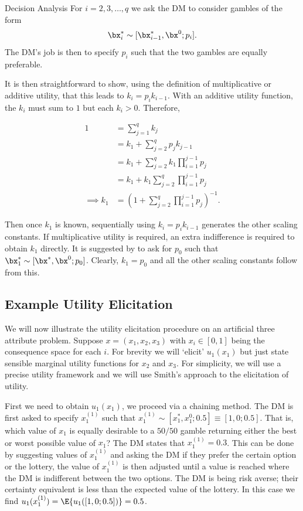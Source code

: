 \begin{chapter}{Decision Analysis \label{Ch:decision}}
For $i = 2,3,\ldots,q$ we ask the DM to consider gambles of the form
$$ \bx^* _i \sim [\bx_{i-1}^*, \bx^0; p_i]. $$
The DM's job is then to specify $p_i$ such that the two gambles are equally preferable.

It is then straightforward to show, using the definition of multiplicative or additive utility, that this leads to $k_i = p_i k_{i-1}$. With an additive utility function, the $k_i$ must sum to $1$ but each $k_i > 0$. Therefore,

\begin{align}
	1 &= \sum_{j=1}^q k_j\\
	& = k_1 + \sum_{j=2}^q p_j k_{j-1}\\
	& = k_1 + \sum_{j=2}^q k_1 \prod_{i=1}^{j-1} p_j\\
	& = k_1 + k_1\sum_{j=2}^q \prod_{i=1}^{j-1} p_j\\
	\implies  k_1 & = \left(1 + \sum_{j=2}^q \prod_{i=1}^{j-1} p_j \right)^{-1}. \label{Eq:k1-soln}
\end{align}

Then once $k_1$ is known, sequentially using $k_i = p_i k_{i-1}$ generates the other scaling constants. If multiplicative utility is required, an extra indifference is required to obtain $k_1$ directly. It is suggested by \citet{Smith2010} to ask for $p_0$ such that $\bx_1 ^* \sim [\bx^*, \bx^0 ;p_0]$. Clearly, $k_1 = p_0$ and all the other scaling constants follow from this.

\subsection{Example Utility Elicitation}

We will now illustrate the utility elicitation procedure on an artificial three attribute problem. Suppose $x = (x_1, x_2, x_3)$ with $x_i \in [0,1]$ being the consequence space for each $i$. For brevity we will `elicit' $u_1(x_1)$ but just state sensible marginal utility functions for $x_2$ and $x_3$. For simplicity, we will use a precise utility framework and we will use Smith's approach to the elicitation of utility.

First we need to obtain $u_1(x_1)$, we proceed via a chaining method. The DM is first asked to specify $x_1^{(1)}$ such that $x_1^{(1)} \sim [x_1^*, x_1^0; 0.5] \equiv [1,0;0.5]$. That is, which value of $x_1$ is equally desirable to a $50/50$ gamble returning either the best or worst possible value of $x_1$? The DM states that $x_1^{(1)} = 0.3$.  This can be done by suggesting values of $x_1^{(1)}$ and asking the DM if they prefer the certain option or the lottery, the value of $x_1^{(1)}$ is then adjusted until a value is reached where the DM is indifferent between the two options. The DM is being risk averse; their certainty equivalent is less than the expected value of the lottery. In this case we find $u_1(x_1^{(1)}) = \E \{ u_1([1,0;0.5]) \} = 0.5$.


\end{chapter}

